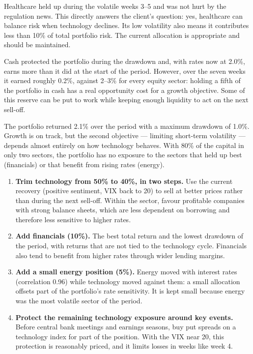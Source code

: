 \documentclass[11pt]{article}
\begin{document}
Healthcare held up during the volatile weeks 3--5 and was not hurt by the
regulation news. This directly answers the client's question: yes, healthcare
can balance risk when technology declines. Its low volatility also means it
contributes less than 10\% of total portfolio risk. The current allocation is
appropriate and should be maintained.

Cash protected the portfolio during the drawdown and, with rates now at 2.0\%,
earns more than it did at the start of the period. However, over the seven
weeks it earned roughly 0.2\%, against 2--3\% for every equity sector: holding
a fifth of the portfolio in cash has a real opportunity cost for a growth
objective. Some of this reserve can be put to work while keeping enough
liquidity to act on the next sell-off.

The portfolio returned 2.1\% over the period with a maximum drawdown of
1.0\%. Growth is on track, but the second objective --- limiting short-term
volatility --- depends almost entirely on how technology behaves. With 80\% of
the capital in only two sectors, the portfolio has no exposure to the sectors
that held up best (financials) or that benefit from rising rates (energy).


\begin{enumerate}[leftmargin=1.5em, itemsep=3pt]
  \item \textbf{Trim technology from 50\% to 40\%, in two steps.} Use the
  current recovery (positive sentiment, VIX back to 20) to sell at better
  prices rather than during the next sell-off. Within the sector, favour
  profitable companies with strong balance sheets, which are less dependent
  on borrowing and therefore less sensitive to higher rates.
  \item \textbf{Add financials (10\%).} The best total return and the lowest
  drawdown of the period, with returns that are not tied to the technology
  cycle. Financials also tend to benefit from higher rates through wider
  lending margins.
  \item \textbf{Add a small energy position (5\%).} Energy moved with
  interest rates (correlation 0.96) while technology moved against them: a
  small allocation offsets part of the portfolio's rate sensitivity. It is
  kept small because energy was the most volatile sector of the period.
  \item \textbf{Protect the remaining technology exposure around key events.}
  Before central bank meetings and earnings seasons, buy put spreads on a
  technology index for part of the position. With the VIX near 20, this
  protection is reasonably priced, and it limits losses in weeks like week 4.
\end{enumerate}
\end{document}
